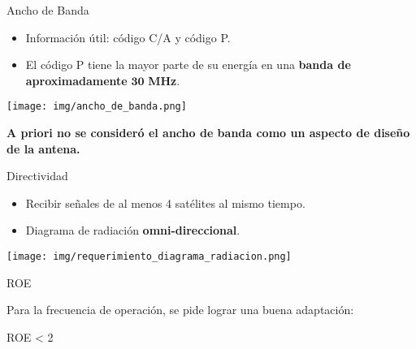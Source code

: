 \begin{frame}{Ancho de Banda}

\begin{itemize}
    \item<1-> Información útil: código C/A y código P.
    \item<2-> El código P tiene la mayor parte de su energía en una \textbf{banda de aproximadamente} $\mathbf{30}$ \textbf{MHz}.
\end{itemize}
\begin{center}
    \texttt{[image: img/ancho\_de\_banda.png]}
\end{center}

\begin{center}
\textbf{A priori no se consideró el ancho de banda como un aspecto de diseño de la antena.}
\end{center}
\end{frame}

\begin{frame}{Directividad}

\begin{itemize}
    \item<1-> Recibir señales de al menos 4 satélites al mismo tiempo.
    \item<2-> Diagrama de radiación \textbf{omni-direccional}.
\end{itemize}

\begin{center}
\texttt{[image: img/requerimiento\_diagrama\_radiacion.png]}
\end{center}

\end{frame}

\begin{frame}{ROE}

\begin{center}
   Para la frecuencia de operación, se pide lograr una buena adaptación: 
\end{center}

\vspace{0.5cm}

\begin{center}
    ROE < 2
\end{center}

\end{frame}
